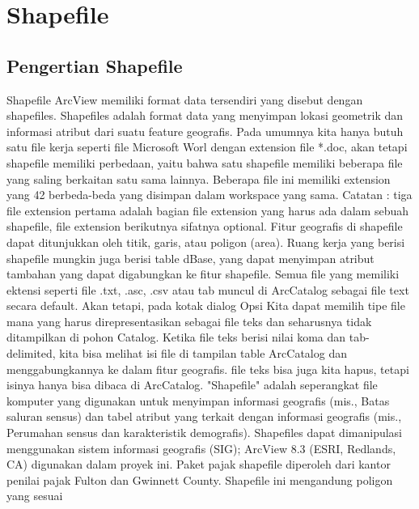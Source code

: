 

\section{Shapefile}
\subsection{Pengertian Shapefile}
Shapefile ArcView memiliki format data tersendiri yang disebut dengan shapefiles. 
Shapefiles adalah format data yang menyimpan lokasi geometrik dan informasi atribut dari suatu feature geografis. 
Pada umumnya kita hanya butuh satu file kerja seperti file Microsoft Worl dengan extension file *.doc, 
akan tetapi shapefile memiliki perbedaan, yaitu bahwa satu shapefile memiliki beberapa file yang saling berkaitan satu sama lainnya. 
Beberapa file ini memiliki extension yang 42 berbeda-beda yang disimpan dalam workspace yang sama.
Catatan : tiga file extension pertama adalah bagian file extension yang harus ada dalam sebuah shapefile, file extension berikutnya sifatnya optional. \cite{surya2013sistem}
Fitur geografis di shapefile dapat ditunjukkan oleh titik, garis, atau poligon (area). Ruang kerja yang berisi shapefile
mungkin juga berisi table dBase, yang dapat menyimpan atribut tambahan yang dapat digabungkan ke fitur shapefile.
Semua file yang memiliki ektensi seperti file .txt, .asc, .csv atau tab muncul di ArcCatalog sebagai file text secara default.
Akan tetapi, pada kotak dialog Opsi Kita dapat memilih tipe file mana yang harus direpresentasikan sebagai file
teks dan seharusnya tidak ditampilkan di pohon Catalog. Ketika file teks berisi nilai koma dan tab-delimited,
kita bisa melihat isi file di tampilan table ArcCatalog dan menggabungkannya ke dalam fitur geografis. file teks bisa juga kita hapus, tetapi isinya hanya bisa dibaca di ArcCatalog.\cite{kennedy2013introducing}
"Shapefile" adalah seperangkat file komputer yang digunakan untuk menyimpan informasi geografis (mis., Batas saluran sensus) 
dan tabel atribut yang terkait dengan informasi geografis (mis., Perumahan sensus dan karakteristik demografis). Shapefiles dapat 
dimanipulasi menggunakan sistem informasi geografis (SIG); ArcView 8.3 (ESRI, Redlands, CA) digunakan dalam proyek ini. 
Paket pajak shapefile diperoleh dari kantor penilai pajak Fulton dan Gwinnett County. Shapefile ini mengandung poligon yang sesuai 
